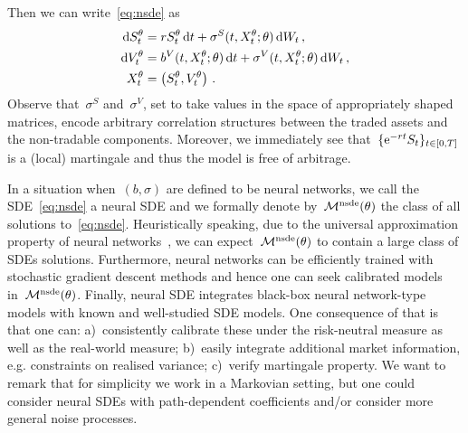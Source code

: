 Then we can write~\eqref{eq:nsde} as
\begin{equation}\label{eq:nsde2}
\begin{split}
\mathrm{d} S^{\theta}_t & = r S_t^{\theta} \,\mathrm{d} t + \sigma^S(t,X_t^\theta;\theta )\,\mathrm{d} W_t\,,\\
\mathrm{d} V^\theta_t & = b^V(t,X_t^{\theta}; \theta) \,\mathrm{d} t + \sigma^V(t,X_t^\theta;\theta )\,\mathrm{d} W_t\,,\\
X^\theta_t & = \left(S^\theta_t, V^\theta_t\right)	\,.
\end{split}
\end{equation}
Observe that~$\sigma^S$ and~$\sigma^V$, set to take values in the space of appropriately shaped matrices, encode arbitrary correlation structures between the traded assets and the non-tradable components.
Moreover, we immediately see that~$\{\mathrm{e}^{-rt}S_t\}_{t\in[0, T]}$ is a (local) martingale and thus the model is free of arbitrage. 

In a situation when~$(b,\sigma)$ are defined to be neural networks, we call the SDE~\eqref{eq:nsde} a neural SDE and we formally denote by~$\mathcal{M}^{\text{nsde}}(\theta)$ the class of all solutions to~\eqref{eq:nsde}. 
Heuristically speaking, due to the universal approximation property of neural networks~\cite{Hornik1991ApproximationNetworks, Sontag1997CompleteNetworks, Cuchiero2019DeepODEs}, we can expect~$\mathcal{M}^{\text{nsde}}(\theta)$ to contain a large class of SDEs solutions.
Furthermore, neural networks can be efficiently trained with stochastic gradient descent methods and hence one can seek calibrated models in~$\mathcal{M}^{\text{nsde}}(\theta)$. 
Finally, neural SDE integrates black-box neural network-type models with known and well-studied SDE models. 
One consequence of that is that one can: a)~consistently calibrate these under the risk-neutral measure as well as the real-world measure; b)~easily integrate additional market information, e.g. constraints on realised variance; c)~verify martingale property. We want to remark that for simplicity we work in a Markovian setting, but one could consider neural SDEs with path-dependent coefficients and/or consider more general noise processes.

